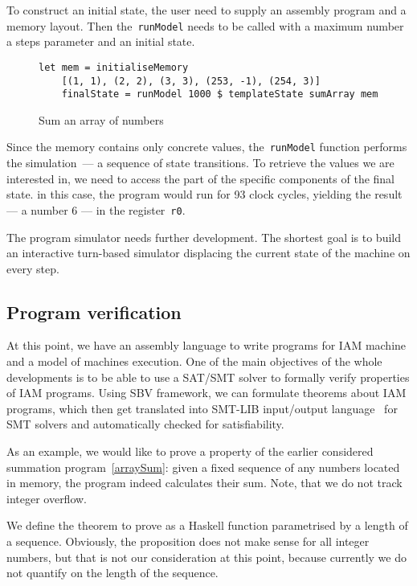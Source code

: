 To construct an initial state, the user need to supply an assembly program and
a memory layout. Then the~\texttt{runModel} needs to be called
with a maximum number a steps parameter and an initial state.

\begin{figure}[H]
\begin{verbatim}
let mem = initialiseMemory
    [(1, 1), (2, 2), (3, 3), (253, -1), (254, 3)]
    finalState = runModel 1000 $ templateState sumArray mem
\end{verbatim}
\caption{Sum an array of numbers}
\end{figure}

Since the memory contains only concrete values, the~\texttt{runModel}
function performs the simulation~--- a sequence of state transitions. To retrieve
the values we are interested in, we need to access the part of the specific components
of the final state. in this case, the program would run for 93 clock cycles, yielding
the result --- a number 6 --- in the register~\texttt{r0}.

The program simulator needs further development. The shortest goal is to build an
interactive turn-based simulator displacing the current state of the machine on every step.

\subsection{Program verification}

At this point, we have an assembly language to write programs for IAM machine
and a model of machines execution. One of the main objectives of the whole
developments is to be able to use a SAT/SMT solver to formally verify properties
of IAM programs. Using SBV framework, we can formulate theorems about IAM programs,
which then get translated into SMT-LIB input/output language~\cite{smtlib} for SMT solvers and
automatically checked for satisfiability.

As an example, we would like to prove a property of the earlier considered
summation program~\ref{arraySum}: given a fixed sequence of any numbers located in memory,
the program indeed calculates their sum. Note, that we do not track integer overflow.

We define the theorem to prove as a Haskell function parametrised by a length of a sequence.
Obviously, the proposition does not make sense for all integer numbers, but that is not our
consideration at this point, because currently we do not quantify on the length of the
sequence.


